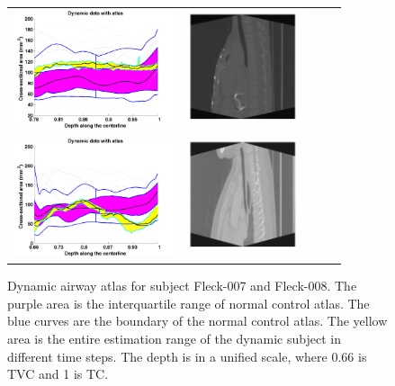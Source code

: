 \begin{figure}[tb]
  \begin{center}
    \begin{tabular}{ccc}
    \includegraphics[height=35mm] {fig/Fleck_007_wfbplot.png}
    \includegraphics[height=35mm] {fig/Fleck_007.png} \\
    \includegraphics[height=35mm] {fig/Fleck_008_wfbplot.png}
    \includegraphics[height=35mm] {fig/Fleck_008.png} \\
    \end{tabular}
    \caption{ \label{fig:Fleck} Dynamic airway atlas for subject Fleck-007 and Fleck-008. The purple area is the interquartile range of normal control atlas. The blue curves are the boundary of the normal control atlas. The yellow area is the entire estimation range of the dynamic subject in different time steps. The depth is in a unified scale, where 0.66 is TVC and 1 is TC.
    }
  \end{center}
\end{figure}